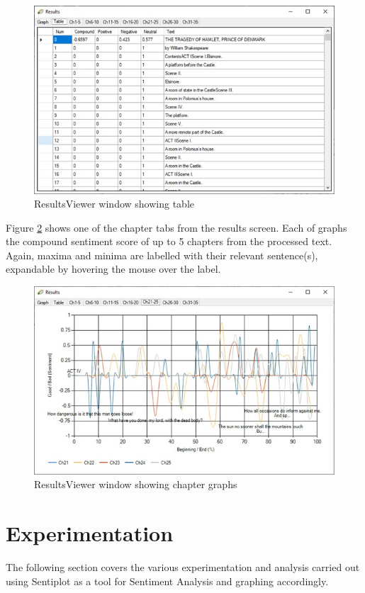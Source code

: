 \documentclass{article}
\begin{document}
        \begin{figure}[H]
            \includegraphics[width=1\textwidth]{Misc/resultstable}
            \caption{ResultsViewer window showing table}
            \label{fig:resultstable}
        \end{figure}
        Figure \ref{fig:resultschapters} shows one of the chapter tabs from the results screen. Each of graphs the compound sentiment score of up to 5 chapters from the processed text. Again, maxima and minima are labelled with their relevant sentence(s), expandable by hovering the mouse over the label.
        \begin{figure}[H]
            \includegraphics[width=1\textwidth]{Misc/resultschapters}
            \caption{ResultsViewer window showing chapter graphs}
            \label{fig:resultschapters}
        \end{figure}
\newpage
\section{Experimentation}
The following section covers the various experimentation and analysis carried out using Sentiplot as a tool for Sentiment Analysis and graphing accordingly.
\end{document}
